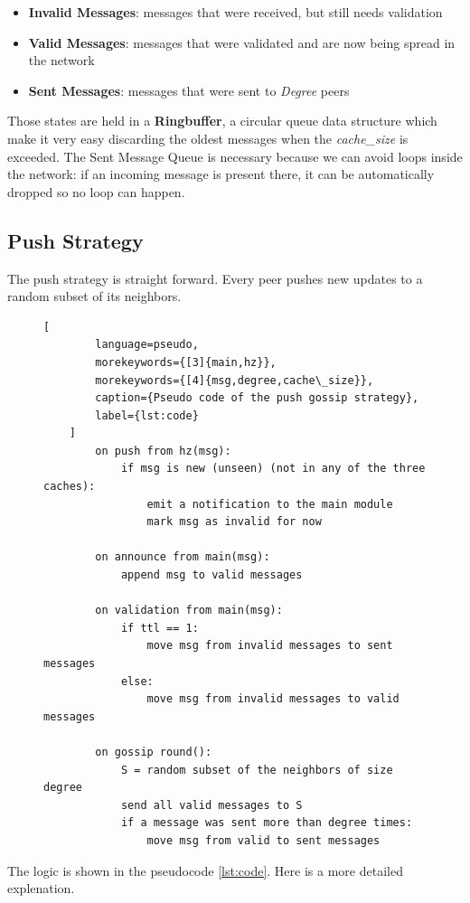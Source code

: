 \documentclass[a4paper,english,10pt,NET]{tumarticle}
\begin{document}
\begin{itemize}
	\item \textbf{Invalid Messages}: messages that were received, but still needs validation
	\item \textbf{Valid Messages}: messages that were validated and are now being spread in the network
	\item \textbf{Sent Messages}: messages that were sent to \textit{Degree} peers 
\end{itemize}

Those states are held in a \textbf{Ringbuffer}, a circular queue data structure which make it very easy discarding the oldest messages when the \textit{cache\_size} is exceeded. The Sent Message Queue is necessary because we can avoid loops inside the network: if an incoming message is present there, it can be automatically dropped so no loop can happen.

\subsection{Push Strategy}
The push strategy is straight forward.
Every peer pushes new updates to a random subset of its neighbors. 

\begin{figure}
	\centering
\begin{minipage}{0.50\linewidth}
	\begin{lstlisting}[
		language=pseudo,
		morekeywords={[3]{main,hz}},
		morekeywords={[4]{msg,degree,cache\_size}},
		caption={Pseudo code of the push gossip strategy},
		label={lst:code}
	]
		on push from hz(msg):
			if msg is new (unseen) (not in any of the three caches):
				emit a notification to the main module
				mark msg as invalid for now

		on announce from main(msg):
			append msg to valid messages

		on validation from main(msg):
			if ttl == 1:
				move msg from invalid messages to sent messages
			else:
				move msg from invalid messages to valid messages

		on gossip round():
			S = random subset of the neighbors of size degree
			send all valid messages to S
			if a message was sent more than degree times:
				move msg from valid to sent messages
	\end{lstlisting}
\end{minipage}
\end{figure}

The logic is shown in the pseudocode \ref{lst:code}. Here is a more detailed explenation.
\end{document}
